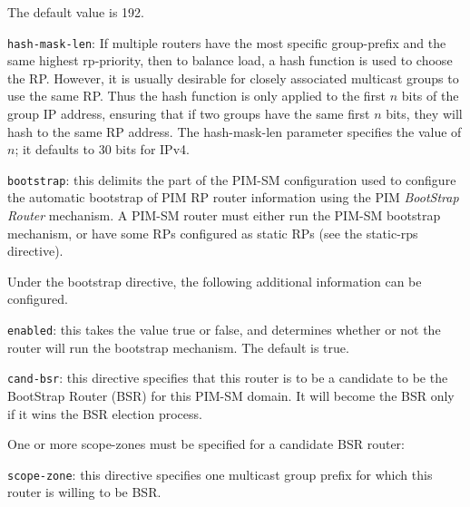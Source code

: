 \begin{description}
\begin{description}
\begin{description}
\begin{description}
  The default value is 192.
\item{\tt hash-mask-len}: If multiple routers have the most specific
  {\stt group-prefix} and the same highest {\stt rp-priority}, then to
  balance load, a hash function is used to choose the RP.  However, it
  is usually desirable for closely associated multicast groups to use
  the same RP.  Thus the hash function is only applied to the first
  $n$ bits of the group IP address, ensuring that if two groups have
  the same first $n$ bits, they will hash to the same RP address.  The
  {\stt hash-mask-len} parameter specifies the value of $n$; it
  defaults to 30 bits for IPv4.
\end{description}
\end{description}
\end{description}
\item{\tt bootstrap}: this delimits the part of the PIM-SM
  configuration used to configure the automatic bootstrap of PIM RP
  router information using the PIM {\it BootStrap Router} mechanism.  A
  PIM-SM router must either run the PIM-SM bootstrap mechanism, or
  have some RPs configured as static RPs (see the {\stt static-rps}
  directive).

  Under the {\stt bootstrap} directive, the following additional
  information can be configured.
\begin{description}
\item{\tt enabled}: this takes the value {\stt true} or {\stt false},
  and determines whether or not the router will run the {\stt
  bootstrap} mechanism.  The default is {\stt true}.
\item{\tt cand-bsr}: this directive specifies that this router is to
  be a candidate to be the BootStrap Router (BSR) for this PIM-SM domain.
  It will become the BSR only if it wins the BSR election process.

  One or more {\stt scope-zone}s must be specified for a candidate BSR
  router:
\begin{description}
\item{\tt scope-zone}: this directive specifies one multicast group
  prefix for which this router is willing to be BSR. 
 

\end{description}
\end{description}
\end{description}
